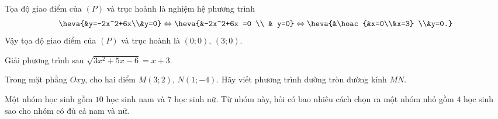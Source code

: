 \begin{bt}
{\begin{listEX}
\begin{itemize}
\begin{center}
				\end{center}
			\end{itemize}
			\item Tọa độ giao điểm của $(P)$ và trục hoành là nghiệm hệ phương trình
			$$\heva{&y=-2x^2+6x\\&y=0} \Leftrightarrow \heva{&-2x^2+6x =0 \\ & y=0} \Leftrightarrow \heva{&\hoac{&x=0\\&x=3} \\&y=0.}$$
			Vậy tọa độ giao điểm của $(P)$ và trục hoành là $(0;0)$, $(3;0)$.
		\end{listEX}
	}
\end{bt}

\begin{bt}%
	Giải phương trình sau $\sqrt{3x^2+5x-6}=x+3$.
\end{bt}

\begin{bt}%
	Trong mặt phẳng $Oxy$, cho hai điểm $M(3;2)$, $N(1;-4)$. Hãy viết phương trình đường tròn đường kính $MN$.
\end{bt}

\begin{bt}%
	Một nhóm học sinh gồm $10$ học sinh nam và $7$ học sinh nữ. Từ nhóm này, hỏi có bao nhiêu cách chọn ra một nhóm nhỏ gồm $4$ học sinh sao cho nhóm có đủ cả nam và nữ.
\end{bt}

